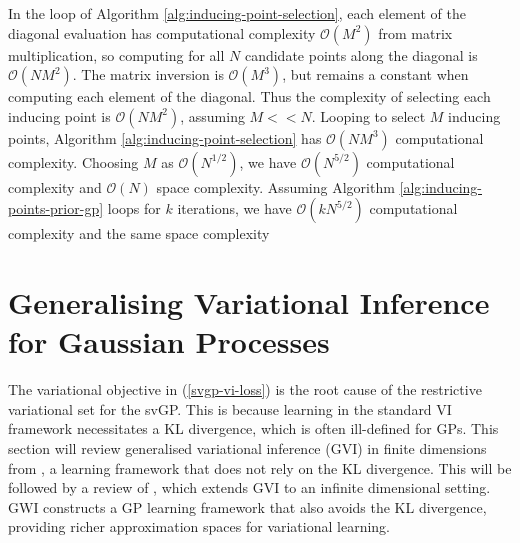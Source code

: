 \documentclass{article}
\numberwithin{equation}{section}
\begin{document}
In the loop of Algorithm \ref{alg:inducing-point-selection}, each element of the diagonal evaluation has computational complexity $\mathcal{O}(M^2)$ from matrix multiplication, so computing for all $N$ candidate points along the diagonal is $\mathcal{O}(NM^2)$.
The matrix inversion is $\mathcal{O}(M^3)$, but remains a constant when computing each element of the diagonal.
Thus the complexity of selecting each inducing point is $\mathcal{O}(NM^2)$, assuming $M << N$.
Looping to select $M$ inducing points, Algorithm \ref{alg:inducing-point-selection} has $\mathcal{O}(NM^3)$ computational complexity.
Choosing $M$ as $\mathcal{O}(N^{1/2})$, we have $\mathcal{O}(N^{5/2})$ computational complexity and $\mathcal{O}(N)$ space complexity. 
Assuming Algorithm \ref{alg:inducing-points-prior-gp} loops for $k$ iterations, we have $\mathcal{O}(k N^{5/2})$ computational complexity and the same space complexity



\newpage
\section{Generalising Variational Inference for Gaussian Processes}\label{section:gvi-for-gps}
The variational objective in (\ref{svgp-vi-loss}) is the root cause of the restrictive variational set for the svGP. 
This is because learning in the standard VI framework necessitates a KL divergence, which is often ill-defined for GPs.
This section will review generalised variational inference (GVI) in finite dimensions from \cite{knoblauch2022optimization}, a learning framework that does not rely on the KL divergence.
This will be followed by a review of \cite{wild2022generalized}, which extends GVI to an infinite dimensional setting.
GWI constructs a GP learning framework that also avoids the KL divergence, providing richer approximation spaces for variational learning.
\end{document}
